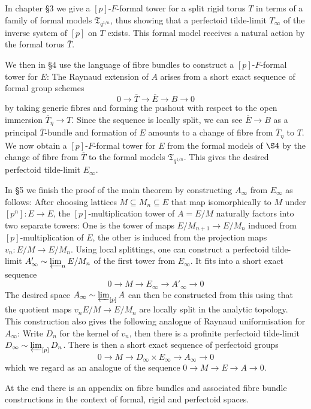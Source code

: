 \documentclass[10pt,oneside]{amsart}
\theoremstyle{definition}
\begin{document}
In chapter \S3 we give a $[p]$-$F$-formal tower for a  split rigid torus $T$ in terms of a family of formal models $\mathfrak T_{q^{1/n}}$, thus showing that a perfectoid tilde-limit $T_\infty$ of the inverse system of $[p]$ on $T$ exists. This formal model receives a natural action by the formal torus $\overline{T}$.
 
We then in \S4 use the language of fibre bundles to construct a  $[p]$-$F$-formal tower for $E$: The Raynaud extension of $A$ arises from a short exact sequence of formal group schemes
\[0\rightarrow \overline{T}\rightarrow \overline{E}\rightarrow B\rightarrow 0\]
by taking generic fibres and forming the pushout with respect to the open immersion $\overline{T}_\eta\rightarrow T$. Since the sequence is locally split, we can see $\overline{E}\rightarrow B$ as a principal $\overline{T}$-bundle and formation of $E$ amounts to a change of fibre from $\overline{T}_\eta$ to $T$. We now obtain a $[p]$-$F$-formal tower for $E$ from the formal models of $\S 4$ by the change of fibre from $\overline{T}$ to the formal models $\mathfrak T_{q^{1/n}}$. This gives the desired perfectoid tilde-limit $E_\infty$.

In \S5 we finish the proof of the main theorem by constructing $A_\infty$ from $E_\infty$ as follows: After choosing lattices $M\subseteq M_n\subseteq E$ that map isomorphically to $M$ under $[p^n]:E\rightarrow E$, the $[p]$-multiplication tower of $A=E/M$ naturally factors into two separate towers: One is the tower of maps $E/M_{n+1}\rightarrow E/M_n$ induced from $[p]$-multiplication of $E$, the other is induced from the projection maps $v_n:E/M\rightarrow E/M_n$. Using local splittings, one can construct a perfectoid tilde-limit $A'_\infty\sim \varprojlim_n E/M_n$ of the first tower from $E_\infty$. It fits into a short exact sequence
\[0\to M\to E_\infty\to A'_\infty\to 0 \]
 The desired space $A_\infty\sim \varprojlim_{[p]}A$ can then be constructed from this using that the quotient maps $v_nE/M\rightarrow E/M_n$ are locally split in the analytic topology. This construction also gives the following analogue of Raynaud uniformisation for $A_\infty$: Write $D_n$ for the kernel of $v_n$, then there is a profinite perfectoid tilde-limit $D_\infty\sim \varprojlim_{[p]} D_n$. There is then a short exact sequence of perfectoid groups
\[0\rightarrow M\rightarrow D_\infty \times E_\infty \rightarrow A_\infty\rightarrow 0\]
which we regard as an analogue of the sequence $0\rightarrow M\rightarrow E\rightarrow A\rightarrow 0$.

At the end there is an appendix on fibre bundles and associated fibre bundle constructions in the context of formal, rigid and perfectoid spaces.
\end{document}
